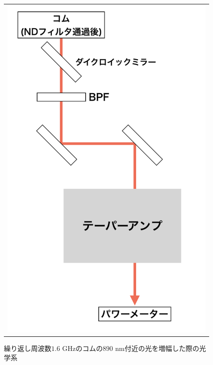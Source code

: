 \documentclass[uplatex, dvipdfmx, a4paper, report, papersize, 11pt]{jsbook}
\begin{document}
\begin{figure}[htpb]
\begin{tabular}{c}
      \begin{minipage}{0.5\hsize}
        \centering
          \includegraphics[keepaspectratio,  scale=0.3,  angle=0]
                          {figures/chapter4/890_astro_amp_diagram.png}
                          \caption{繰り返し周波数$1.6$ GHzのコムの$890$ nm付近の光を増幅した際の光学系}
                          \label{890_astro_amp_diagram}
      \end{minipage}

    \end{tabular}
\end{figure}
\newpage
\end{document}
